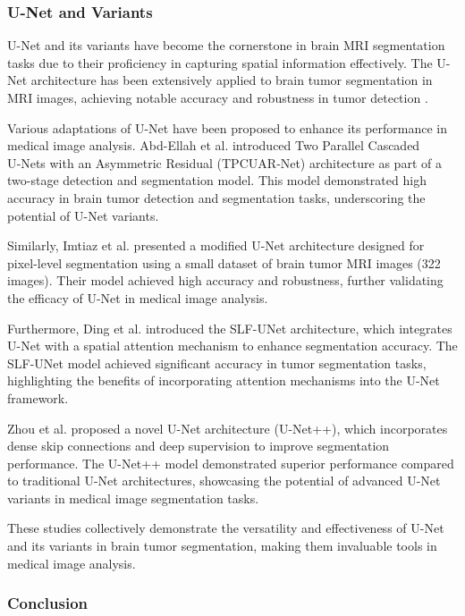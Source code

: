 \subsubsection{U-Net and Variants}

U-Net and its variants have become the cornerstone in brain MRI segmentation tasks due to their proficiency in capturing spatial information effectively. The U-Net architecture has been extensively applied to brain tumor segmentation in MRI images, achieving notable accuracy and robustness in tumor detection \cite{imtiaz_brain_2023, abd-ellah_automatic_2024, ding_slf-unet_2024}.

Various adaptations of U-Net have been proposed to enhance its performance in medical image analysis. Abd-Ellah et al. \cite{abd-ellah_automatic_2024} introduced Two Parallel Cascaded U‑Nets with an Asymmetric Residual (TPCUAR‑Net) architecture as part of a two-stage detection and segmentation model. This model demonstrated high accuracy in brain tumor detection and segmentation tasks, underscoring the potential of U-Net variants.

Similarly, Imtiaz et al. \cite{imtiaz_brain_2023} presented a modified U-Net architecture designed for pixel-level segmentation using a small dataset of brain tumor MRI images (322 images). Their model achieved high accuracy and robustness, further validating the efficacy of U-Net in medical image analysis.

Furthermore, Ding et al. \cite{ding_slf-unet_2024} introduced the SLF-UNet architecture, which integrates U-Net with a spatial attention mechanism to enhance segmentation accuracy. The SLF-UNet model achieved significant accuracy in tumor segmentation tasks, highlighting the benefits of incorporating attention mechanisms into the U-Net framework.

Zhou et al. \cite{zhou2018unetplusplus} proposed a novel U-Net architecture (U-Net++), which incorporates dense skip connections and deep supervision to improve segmentation performance. The U-Net++ model demonstrated superior performance compared to traditional U-Net architectures, showcasing the potential of advanced U-Net variants in medical image segmentation tasks.

These studies collectively demonstrate the versatility and effectiveness of U-Net and its variants in brain tumor segmentation, making them invaluable tools in medical image analysis.


\subsubsection{Conclusion}

